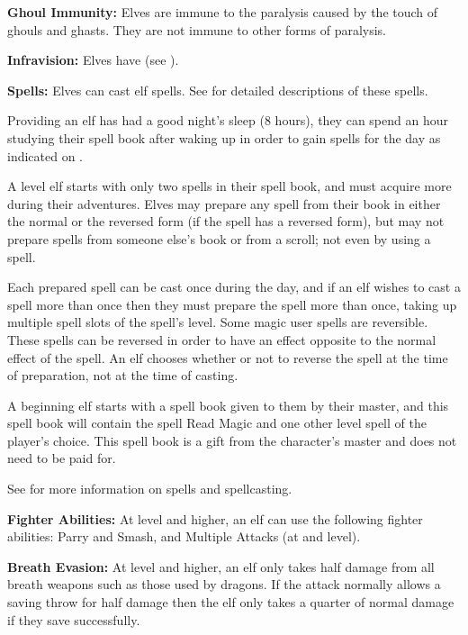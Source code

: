 \begin{multicols*}{2}
\textbf{Ghoul Immunity:} Elves are immune to the paralysis caused by the touch of ghouls and ghasts. They are not immune to other forms of paralysis.

\textbf{Infravision:} Elves have  (see ).

\textbf{Spells:} Elves can cast elf spells. See  for detailed descriptions of these spells.

Providing an elf has had a good night’s sleep (8 hours), they can spend an hour studying their spell book after waking up in order to gain spells for the day as indicated on .

A  level elf starts with only two spells in their spell book, and must acquire more during their adventures. Elves may prepare any spell from their book in either the normal or the reversed form (if the spell has a reversed form), but may not prepare spells from someone else’s book or from a scroll; not even by using a  spell.

Each prepared spell can be cast once during the day, and if an elf wishes to cast a spell more than once then they must prepare the spell more than once, taking up multiple spell slots of the spell’s level. Some magic user spells are reversible. These spells can be reversed in order to have an effect opposite to the normal effect of the spell. An elf chooses whether or not to reverse the spell at the time of preparation, not at the time of casting.

A beginning elf starts with a spell book given to them by their master, and this spell book will contain the spell Read Magic and one other  level spell of the player’s choice. This spell book is a gift from the character’s master and does not need to be paid for.

See  for more information on spells and spellcasting.

\textbf{Fighter Abilities:} At  level and higher, an elf can use the following fighter abilities: Parry and Smash, and Multiple Attacks (at  and  level).

\textbf{Breath Evasion:} At  level and higher, an elf only takes half damage from all breath weapons such as those used by dragons. If the attack normally allows a saving throw for half damage then the elf only takes a quarter of normal damage if they save successfully.


\end{multicols*}

